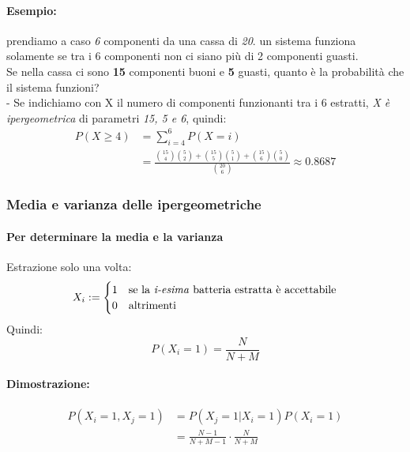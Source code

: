 \documentclass[]{article}
\begin{document}
    \paragraph{Esempio:} prendiamo a caso \textit{6} componenti da una cassa di \textit{20}. un sistema funziona solamente se tra i 6 componenti
    non ci siano più di 2 componenti guasti. \\
    Se nella cassa ci sono \textbf{15} componenti buoni e \textbf{5} guasti, quanto è la probabilità che il sistema funzioni? \\
    - Se indichiamo con X il numero di componenti funzionanti tra i 6 estratti, \textit{X è ipergeometrica} di parametri \textit{15, 5 e 6}, quindi:
    \begin{equation*}
        \begin{split}
            P(X \geq 4) &= \sum_{i = 4}^{6} P(X = i) \\
            & = \frac{\binom{15}{4} \binom{5}{2} + \binom{15}{5} \binom{5}{1} + \binom{15}{6} \binom{5}{0}}{\binom{20}{6}} \approx 0.8687
        \end{split}
    \end{equation*}

    \subsubsection{Media e varianza delle ipergeometriche}
    \paragraph{Per determinare la media e la varianza} Estrazione solo una volta:
    \begin{equation*}
        X_i :=
        \begin{cases}
            1 & \text{se la \textit{i-esima} batteria estratta è accettabile} \\
            0 & \text{altrimenti}
        \end{cases}
    \end{equation*}
    Quindi:
    \[ P(X_i = 1) = \frac{N}{N + M} \]
    \paragraph{Dimostrazione:} 
    \begin{equation*}
        \begin{split}
            P(X_i = 1, X_j = 1) &= P(X_j = 1 | X_i = 1) P(X_i = 1) \\
            & = \frac{N - 1}{N + M - 1} \cdot \frac{N}{N + M}
        \end{split}
    \end{equation*}
\end{document}
